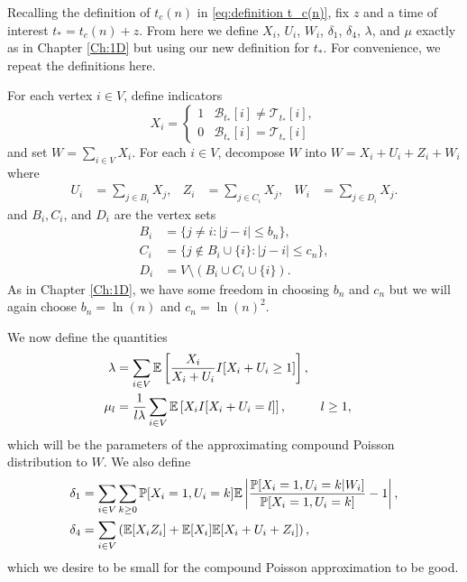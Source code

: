 Recalling the definition of $t_c(n)$ in \eqref{eq:definition t_c(n)}, fix $z$ and a time of interest $t_* = t_c(n) + z$. From here we define $X_i$, $U_i$, $W_i$, $\delta_1$, $\delta_4$, $\lambda$, and $\mu$ exactly as in Chapter \ref{Ch:1D} but using our new definition for $t_*$. For convenience, we repeat the definitions here.

For each vertex $i \in V$, define indicators
	\begin{equation}
		X_i = 
		\begin{cases}
			1 & \mathscr{B}_{t_*}[i] \neq \mathscr{T}_{t_*}[i],\\
			0 & \mathscr{B}_{t_*}[i] = \mathscr{T}_{t_*}[i]
		\end{cases}
	\end{equation}
	and set $W = \sum_{i \in V} X_i$.
	For each $i \in V$, decompose $W$ into $W = X_i + U_i + Z_i + W_i$ where
	\begin{align}
		U_i &= \sum_{j \in B_i} X_j, &
		Z_i &= \sum_{j \in C_i} X_j, &
		W_i &= \sum_{j \in D_i} X_j.
	\end{align}
	and $B_i, C_i$, and $D_i$ are the vertex sets
	\begin{align}
		B_i &= \{j\neq i : |j - i| \leq b_n \},\\
		C_i &= \{j\notin B_i\cup \{i\}: |j - i| \leq c_n \},\\
		D_i &= V \setminus (B_i \cup C_i \cup \{i\}).
	\end{align}
	As in Chapter \ref{Ch:1D}, we have some freedom in choosing $b_n$ and $c_n$ but we will again choose $b_n = \ln(n)$ and $c_n = \ln(n)^2$.

	We now define the quantities
	\begin{align}
		\lambda &= \sum_{i \in V} \mathbb{E}\left[\frac{X_i}{X_i + U_i} I[ X_i + U_i \geq 1] \right],\\
		\mu_l &= \frac{1}{l \lambda} \sum_{i \in V} \mathbb{E}\left[ X_i I[X_i + U_i = l] \right], && l\geq 1,
	\end{align}
	which will be the parameters of the approximating compound Poisson distribution to $W$. We also define
	\begin{align}
		\delta_1 &= \sum_{i \in V}  \sum_{k \geq 0} \mathbb{P}[X_i = 1, U_i = k] \mathbb{E} \left|\frac{\mathbb{P}[X_i = 1, U_i = k|W_i]}{\mathbb{P}[X_i = 1, U_i = k]} - 1 \right|, \label{eq:delta1 nD}\\ 
		\delta_4 &= \sum_{i \in V} \left( \mathbb{E}[X_i Z_i] + \mathbb{E}[X_i] \mathbb{E}[X_i + U_i + Z_i] \right), \label{eq:delta4 nD}
	\end{align}
	which we desire to be small for the compound Poisson approximation to be good.

